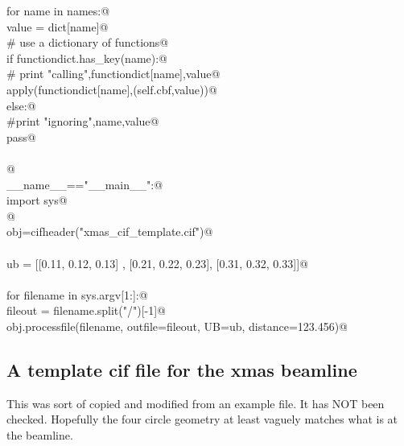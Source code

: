 \documentclass[10pt,a4paper,twoside,notitlepage]{article}
\begin{document}
\begin{flushleft}
\begin{list}{}{}
\mbox{}\verb@        for name in names:@\\
\mbox{}\verb@            value = dict[name]@\\
\mbox{}\verb@            # use a dictionary of functions@\\
\mbox{}\verb@            if functiondict.has_key(name):@\\
\mbox{}\verb@                # print "calling",functiondict[name],value@\\
\mbox{}\verb@                apply(functiondict[name],(self.cbf,value))@\\
\mbox{}\verb@            else:@\\
\mbox{}\verb@                #print "ignoring",name,value@\\
\mbox{}\verb@                pass@\\
\mbox{}\verb@@\\
\mbox{}\verb@        @\\
\mbox{}\verb@if __name__=="__main__":@\\
\mbox{}\verb@    import sys@\\
\mbox{}\verb@    @\\
\mbox{}\verb@    obj=cifheader("xmas_cif_template.cif")@\\
\mbox{}\verb@@\\
\mbox{}\verb@    ub = [[0.11, 0.12, 0.13] , [0.21, 0.22, 0.23], [0.31, 0.32, 0.33]]@\\
\mbox{}\verb@@\\
\mbox{}\verb@    for filename in sys.argv[1:]:@\\
\mbox{}\verb@        fileout = filename.split("/")[-1]@\\
\mbox{}\verb@        obj.processfile(filename, outfile=fileout, UB=ub, distance=123.456)@\\
\mbox{}\verb@@{\NWsep}
\end{list}
\vspace{-2ex}
\end{flushleft}
\subsection{A template cif file for the xmas beamline}

This was sort of copied and modified from an example file. It has NOT been checked.
Hopefully the four circle geometry at least vaguely matches what is at the beamline.
\end{document}
